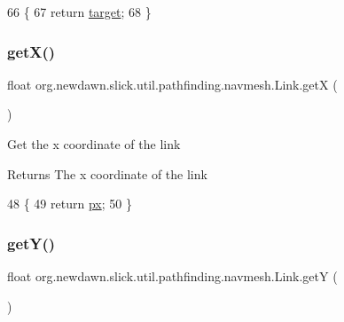 \begin{DoxyCode}
66                              \{
67         \textcolor{keywordflow}{return} \mbox{\hyperlink{classorg_1_1newdawn_1_1slick_1_1util_1_1pathfinding_1_1navmesh_1_1_link_a8820429c2405bded1a2414a245745adf}{target}};
68     \}
\end{DoxyCode}
\mbox{\label{classorg_1_1newdawn_1_1slick_1_1util_1_1pathfinding_1_1navmesh_1_1_link_acb0934e4dbdde87a43885d3d09cd483f}} 
\subsubsection{\texorpdfstring{get\+X()}{getX()}}
{\footnotesize\ttfamily float org.\+newdawn.\+slick.\+util.\+pathfinding.\+navmesh.\+Link.\+getX (\begin{DoxyParamCaption}{ }\end{DoxyParamCaption})\hspace{0.3cm}{\ttfamily [inline]}}

Get the x coordinate of the link

\begin{DoxyReturn}{Returns}
The x coordinate of the link 
\end{DoxyReturn}

\begin{DoxyCode}
48                         \{
49         \textcolor{keywordflow}{return} \mbox{\hyperlink{classorg_1_1newdawn_1_1slick_1_1util_1_1pathfinding_1_1navmesh_1_1_link_a83c2e5065b4ed17f607670d6d295bdb0}{px}};
50     \}
\end{DoxyCode}
\mbox{\label{classorg_1_1newdawn_1_1slick_1_1util_1_1pathfinding_1_1navmesh_1_1_link_a6e107389c6c50466b18c78f0e7e0ae5c}} 
\subsubsection{\texorpdfstring{get\+Y()}{getY()}}
{\footnotesize\ttfamily float org.\+newdawn.\+slick.\+util.\+pathfinding.\+navmesh.\+Link.\+getY (\begin{DoxyParamCaption}{ }\end{DoxyParamCaption})\hspace{0.3cm}{\ttfamily [inline]}}


